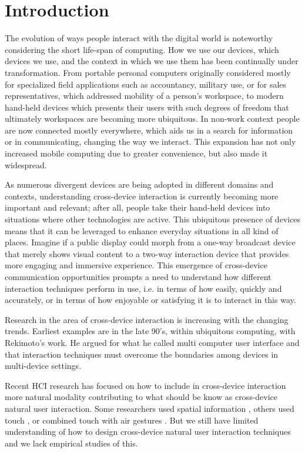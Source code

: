 \section{Introduction} \label{sec:introduction}
The evolution of ways people interact with the digital world is noteworthy considering the short life-span of computing. How we use our devices, which devices we use, and the context in which we use them has been continually under transformation. 
From portable personal computers originally considered mostly for specialized field applications such as accountancy, military use, or for sales representatives, which addressed mobility of a person's workspace, to modern hand-held devices which presents their users with such degrees of freedom that ultimately workspaces are becoming more ubiquitous. 
In non-work context people are now connected mostly everywhere, which aids us in a search for information or in communicating, changing the way we interact. 
This expansion has not only increased mobile computing due to greater convenience, but also made it widespread.\cite{Francis:1997} 

As numerous divergent devices are being adopted in different domains and contexts, understanding cross-device interaction is currently becoming more important and relevant; after all, people take their hand-held devices into situations where other technologies are active. This ubiquitous presence of devices means that it can be leveraged to enhance everyday situations in all kind of places. Imagine if a public display could morph from a one-way broadcast device that merely shows visual content to a two-way interaction device that provides more engaging and immersive experience. This emergence of cross-device communication opportunities prompts a need to understand how different interaction techniques perform in use, i.e. in terms of how easily, quickly and accurately, or in terms of how enjoyable or satisfying it is to interact in this way.

Research in the area of cross-device interaction is increasing with the changing trends. Earliest examples are in the late 90's, within ubiquitous computing, with Rekimoto's work.  He argued for what he called multi computer user interface and that interaction techniques must overcome the boundaries among devices in multi-device settings\cite{Rekimoto:1998}.

Recent HCI research has focused on how to include in cross-device interaction more natural modality contributing to what should be know as cross-device natural user interaction.  Some researchers used spatial information \cite{Marquardt:2011, Marquardt:2012}, others used touch \cite{Seifert:2012}, or combined touch with air gestures \cite{Bragdon:2011} . But we still have limited understanding of how to design cross-device natural user interaction techniques and we lack empirical studies of this.

